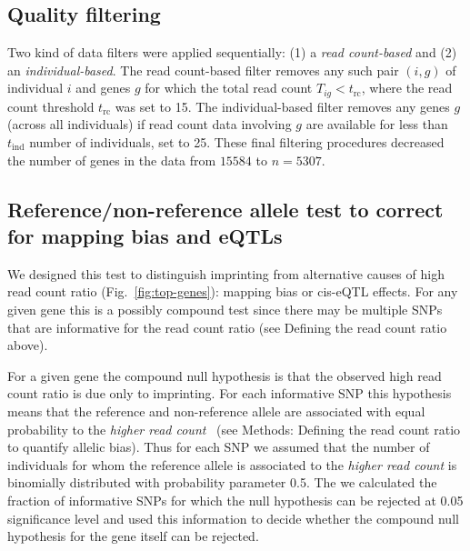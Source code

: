 \documentclass[letterpaper]{article}
\begin{document}

\subsection{Quality filtering}

\label{sec:filtering}

Two kind of data filters were applied sequentially: (1) a \emph{read
count-based} and (2) an \emph{individual-based}.  The read count-based filter
removes any such pair $(i,g)$ of individual $i$ and genes $g$ for which the
total read count $T_{ig}<t_\mathrm{rc}$, where the read count threshold
$t_\mathrm{rc}$ was set to 15. The individual-based filter removes any genes
$g$ (across all individuals) if read count data involving $g$ are available
for less than $t_\mathrm{ind}$ number of individuals, set to 25.
These final filtering procedures decreased the number of genes in the data from
\(15584\) to \(n=5307\).

\subsection{Reference/non-reference allele test to correct for mapping bias
and eQTLs}

We designed this test to distinguish imprinting from alternative causes of
high read count ratio (Fig.~\ref{fig:top-genes}): mapping bias or cis-eQTL
effects.  For any given gene this is a possibly compound test since there may
be multiple SNPs that are informative for the read count ratio (see Defining
the read count ratio above).

For a given gene the compound null hypothesis is that the observed high read
count ratio is due only to imprinting.  For each informative SNP this
hypothesis means that the reference and non-reference allele are associated
with equal probability to the \emph{higher read count}~\cite{Babak2015} (see Methods: Defining
the read count ratio to quantify allelic bias).  Thus for each SNP we assumed
that the number of individuals for whom the reference allele is associated to
the \emph{higher read count} is binomially distributed with probability
parameter 0.5.  The we calculated the fraction of informative SNPs for which the
null hypothesis can be rejected at 0.05 significance level and used this
information to decide whether the compound null hypothesis for the gene itself
can be rejected.
\end{document}
